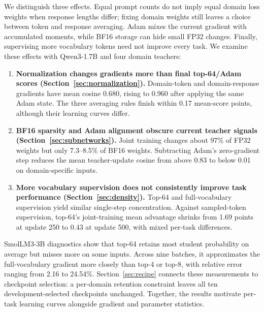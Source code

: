 We distinguish three effects. Equal prompt counts do not imply equal domain loss weights when response lengths differ; fixing domain weights still leaves a choice between token and response averaging. Adam mixes the current gradient with accumulated moments, while BF16 storage can hide small FP32 changes. Finally, supervising more vocabulary tokens need not improve every task. We examine these effects with Qwen3-1.7B and four domain teachers:
\begin{enumerate}
\item \textbf{Normalization changes gradients more than final top-64/Adam scores (Section~\ref{sec:normalization}).}
Domain-token and domain-response gradients have mean cosine 0.680, rising to 0.960 after applying the same Adam state. The three averaging rules finish within 0.17 mean-score points, although their learning curves differ.
\item \textbf{BF16 sparsity and Adam alignment obscure current teacher signals (Section~\ref{sec:subnetworks}).}
Joint training changes about 97\% of FP32 weights but only 7.3--8.5\% of BF16 weights. Subtracting Adam's zero-gradient step reduces the mean teacher-update cosine from above 0.83 to below 0.01 on domain-specific inputs.
\item \textbf{More vocabulary supervision does not consistently improve task performance (Section~\ref{sec:density}).}
Top-64 and full-vocabulary supervision yield similar single-step concentration. Against sampled-token supervision, top-64's joint-training mean advantage shrinks from 1.69 points at update 250 to 0.43 at update 500, with mixed per-task differences.
\end{enumerate}

SmolLM3-3B diagnostics show that top-64 retains most student probability on average but misses more on some inputs. Across nine batches, it approximates the full-vocabulary gradient more closely than top-4 or top-8, with relative error ranging from 2.16 to 24.54\%. Section~\ref{sec:recipe} connects these measurements to checkpoint selection: a per-domain retention constraint leaves all ten development-selected checkpoints unchanged. Together, the results motivate per-task learning curves alongside gradient and parameter statistics.
